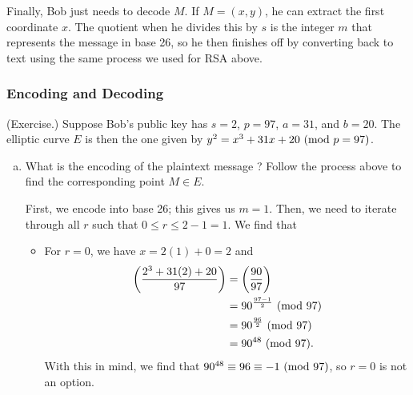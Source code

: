 \documentclass[letterpaper]{article}
\begin{document}
\bigskip 

Finally, Bob just needs to decode $M$. If $M = (x, y)$, he can extract the first coordinate $x$. The quotient when he divides this by $s$ is the integer $m$ that represents the message in base 26, so he then finishes off by converting back to text using the same process we used for RSA above. 

\subsubsection{Encoding and Decoding}
\begin{mdframed}
    (Exercise.) Suppose Bob's public key has $s = 2$, $p = 97$, $a = 31$, and $b = 20$. The elliptic curve $E$ is then the one given by $y^2 = x^3 + 31x + 20 \ (\mathrm{mod}\ p = 97)$. 
    \begin{enumerate}[(a)]
        \item What is the encoding of the plaintext message ? Follow the process above to find the corresponding point $M \in E$. 
        \begin{mdframed}
            First, we encode  into base 26; this gives us $m = 1$. Then, we need to iterate through all $r$ such that $0 \leq r \leq 2 - 1 = 1$. We find that 
            \begin{itemize}
                \item For $r = 0$, we have $x = 2(1) + 0 = 2$ and 
                \begin{equation*}
                    \begin{aligned}
                        \left(\frac{2^3 + 31(2) + 20}{97}\right) &= \left(\frac{90}{97}\right) \\ 
                            &= 90^{\frac{97 - 1}{2}} \ (\mathrm{mod}\ 97) \\ 
                            &= 90^{\frac{96}{2}} \ (\mathrm{mod}\ 97) \\ 
                            &= 90^{48} \ (\mathrm{mod}\ 97).
                    \end{aligned}
                \end{equation*}
                With this in mind, we find that $90^{48} \equiv 96 \equiv -1 \ (\mathrm{mod}\ 97)$, so $r = 0$ is not an option. 


\end{itemize}
\end{mdframed}
\end{enumerate}
\end{mdframed}
\end{document}
